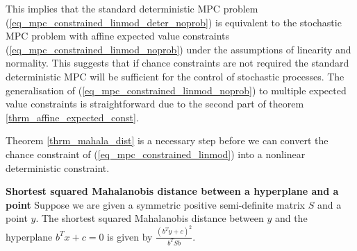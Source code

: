This implies that the standard deterministic MPC problem (\ref{eq_mpc_constrained_linmod_deter_noprob}) is equivalent to the stochastic MPC problem with affine expected value constraints (\ref{eq_mpc_constrained_linmod_noprob}) under the assumptions of linearity and normality. This suggests that if chance constraints are not required the standard deterministic MPC will be sufficient for the control of stochastic processes. The generalisation of (\ref{eq_mpc_constrained_linmod_noprob}) to multiple expected value constraints is straightforward due to the second part of theorem \ref{thrm_affine_expected_const}. 

Theorem \ref{thrm_mahala_dist} is a necessary step before we can convert the chance constraint of (\ref{eq_mpc_constrained_linmod}) into a nonlinear deterministic constraint.
\begin{thrm}
\textbf{Shortest squared Mahalanobis distance between a hyperplane and a point} Suppose we are given a symmetric positive semi-definite matrix $S$ and a point $y$. The shortest squared Mahalanobis distance between $y$ and the hyperplane $b^Tx+c=0$ is given by $\frac{(b^Ty+c)^2}{b^TSb}$.
\label{thrm_mahala_dist}
\end{thrm}

